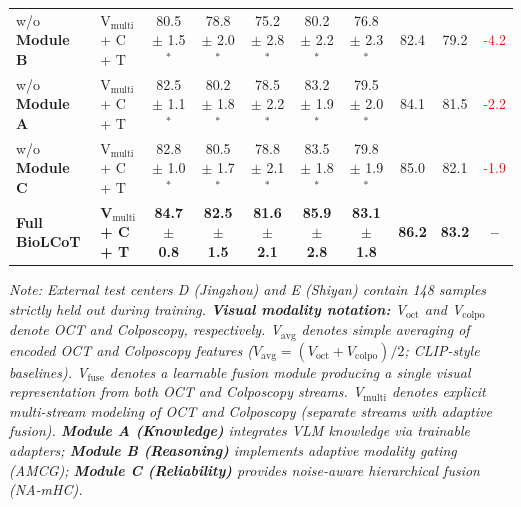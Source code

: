 \begin{table}[t]
{\begin{tabular}{l|l|ccccc|cc|c}
      w/o \textbf{Module B} & V$_{\text{multi}}$ + C + T & 80.5 $\pm$ 1.5$^*$ & 78.8 $\pm$ 2.0$^*$ & 75.2 $\pm$ 2.8$^*$ & 80.2 $\pm$ 2.2$^*$ & 76.8 $\pm$ 2.3$^*$ & 82.4 & 79.2 & \textcolor{red}{-4.2} \\
      w/o \textbf{Module A} & V$_{\text{multi}}$ + C + T & 82.5 $\pm$ 1.1$^*$ & 80.2 $\pm$ 1.8$^*$ & 78.5 $\pm$ 2.2$^*$ & 83.2 $\pm$ 1.9$^*$ & 79.5 $\pm$ 2.0$^*$ & 84.1 & 81.5 & \textcolor{red}{-2.2} \\
      w/o \textbf{Module C} & V$_{\text{multi}}$ + C + T & 82.8 $\pm$ 1.0$^*$ & 80.5 $\pm$ 1.7$^*$ & 78.8 $\pm$ 2.1$^*$ & 83.5 $\pm$ 1.8$^*$ & 79.8 $\pm$ 1.9$^*$ & 85.0 & 82.1 & \textcolor{red}{-1.9} \\
      \midrule
      \rowcolor{gray!10} \textbf{Full BioLCoT} & \textbf{V$_{\text{multi}}$ + C + T} & \textbf{84.7 $\pm$ 0.8} & \textbf{82.5 $\pm$ 1.5} & \textbf{81.6 $\pm$ 2.1} & \textbf{85.9 $\pm$ 2.8} & \textbf{83.1 $\pm$ 1.8} & \textbf{86.2} & \textbf{83.2} & \textbf{--} \\
      \bottomrule
    \end{tabular}%
  }
  \vspace{0.1cm}
  \begin{flushleft}
    \footnotesize
    \textit{Note: External test centers D (Jingzhou) and E (Shiyan) contain 148 samples strictly held out during training. \textbf{Visual modality notation:} V$_{\text{oct}}$ and V$_{\text{colpo}}$ denote OCT and Colposcopy, respectively. V$_{\text{avg}}$ denotes simple averaging of encoded OCT and Colposcopy features ($V_{\text{avg}}=(V_{\text{oct}}+V_{\text{colpo}})/2$; CLIP-style baselines). V$_{\text{fuse}}$ denotes a learnable fusion module producing a single visual representation from both OCT and Colposcopy streams. V$_{\text{multi}}$ denotes explicit multi-stream modeling of OCT and Colposcopy (separate streams with adaptive fusion). \textbf{Module A (Knowledge)} integrates VLM knowledge via trainable adapters; \textbf{Module B (Reasoning)} implements adaptive modality gating (AMCG); \textbf{Module C (Reliability)} provides noise-aware hierarchical fusion (NA-mHC).}
  \end{flushleft}
\end{table}

